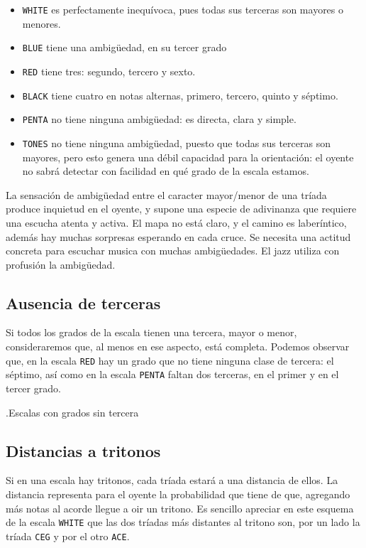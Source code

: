 \documentclass[]{article}
\providecommand{\tightlist}{%
  \setlength{
\itemsep}{0pt}\setlength{\parskip}{0pt}}
\begin{document}
\begin{itemize}   \tightlist   
  \item  \texttt{WHITE} es perfectamente inequívoca, pues todas sus terceras         son mayores o menores.   
  \item  \texttt{BLUE} tiene una ambigüedad, en su tercer grado   
  \item  \texttt{RED} tiene tres: segundo, tercero y sexto.   
  \item  \texttt{BLACK} tiene cuatro en notas alternas, primero, tercero,         quinto y séptimo.   
  \item  \texttt{PENTA} no tiene ninguna ambigüedad: es directa, clara y         simple.   
  \item  \texttt{TONES} no tiene ninguna ambigüedad, puesto que todas sus         terceras son mayores, pero esto genera una débil capacidad para la         orientación: el oyente no sabrá detectar con facilidad en qué grado de         la escala estamos. 
\end{itemize}

La sensación de ambigüedad entre el caracter mayor/menor de una tríada produce inquietud en el oyente, y supone una especie de adivinanza que requiere una escucha atenta y activa. El mapa no está claro, y el camino es laberíntico, además hay muchas sorpresas esperando en cada cruce. Se necesita una actitud concreta para escuchar musica con muchas ambigüedades. El jazz utiliza con profusión la ambigüedad.

\subsection{Ausencia de terceras}

Si todos los grados de la escala tienen una tercera, mayor o menor, consideraremos que, al menos en ese aspecto, está completa. Podemos observar que, en la escala \texttt{RED} hay un grado que no tiene ninguna clase de tercera: el séptimo, así como en la escala \texttt{PENTA} faltan dos terceras, en el primer y en el tercer grado.

.Escalas con grados sin tercera

\subsection{Distancias a tritonos}

Si en una escala hay tritonos, cada tríada estará a una distancia de ellos. La distancia representa para el oyente la probabilidad que tiene de que, agregando más notas al acorde llegue a oir un tritono. Es sencillo apreciar en este esquema de la escala \texttt{WHITE} que las dos tríadas más distantes al tritono son, por un lado la tríada \texttt{CEG} y por el otro \texttt{ACE}.
\end{document}
